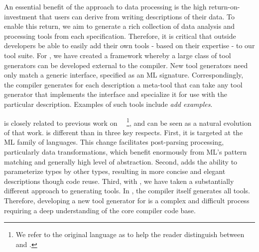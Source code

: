 An essential benefit of the \pads{} approach to data processing is the
high return-on-investment that users can derive from writing 
descriptions of their data. To enable this return, we aim to generate
a rich collection of data analysis and processing tools from each
specification. Therefore, it is critical that outside
developers be able to easily add their own tools - based on their
expertise - to our tool suite.  For \padsml{}, we have created
a framework whereby a large class of tool
generators can be developed external to the compiler.  New tool
generators need only match a generic interface, specified as an ML
signature. Correspondingly, the compiler generates for each
description a meta-tool that can take any tool generator that
implements the interface and specialize it for use with the particular
description.  Examples of such tools include {\em add examples}.

\padsml{} is closely related to previous work on
\padsc{}~\cite{fisher+:pads}~\footnote{We refer to the original \pads{}
  language as \padsc{} to help the reader distinguish between \padsc{}
  and \padsml{}.}, and can be seen as a natural evolution of that
work.  \padsml{} is different than \padsc{} in three key respects.
First, it is targeted at the ML family of languages. 
This change facilitates post-parsing processing, particularly data
transformations, which benefit enormously from ML's pattern matching
and generally high level of abstraction. 
Second, \padsml{}
adds the ability to parameterize types by other types, resulting in
more concise and elegant descriptions though code reuse. Third, with
\padsml{}, we have taken a substantially different approach to
generating tools. In \padsc{}, the compiler itself generates all
tools.  Therefore,
developing a new tool generator for \padsc{} is a complex and
difficult process requiring a deep understanding of the core compiler
code base.


